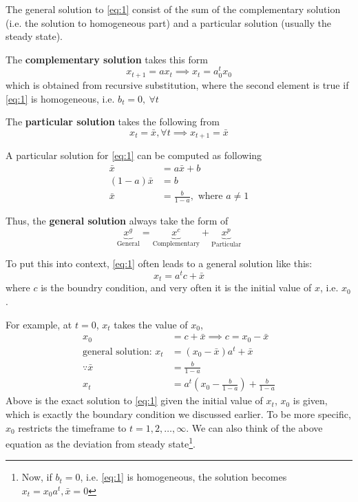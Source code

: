 \documentclass[twocolumn, fleqn]{article}
\begin{document}
		The general solution to \eqref{eq:1} consist of the sum of the complementary solution (i.e. the solution to
		homogeneous part) and a particular solution (usually the steady state).

		The \textbf{complementary solution} takes this form
		\begin{equation*}
			x_{t+1} = a x_t \implies x_t = a_0^t x_0
		\end{equation*}
		which is obtained from recursive substitution, where the second element is true if \eqref{eq:1} is homogeneous,
		i.e. $b_t =0, \ \forall t$

		The \textbf{particular solution} takes the following from
		\begin{equation*}
			x_t = \bar{x}, \forall t \implies x_{t+1}=\bar{x}
		\end{equation*}

		A particular solution for \eqref{eq:1} can be computed as following
		\begin{align*}
			\bar{x} &= a \bar{x} +b \\
			(1-a)\bar{x} &= b\\
			\bar{x} &= \frac{b}{1-a}, \text{ where } a \neq 1
		\end{align*}

		Thus, the \textbf{general solution} always take the form of
		\begin{equation}
			\underbrace{x^g}_{\text{General}} = \underbrace{x^c}_{\text{Complementary}} + \underbrace{x^p}_{
				\text{Particular}}\label{eq:1.2}
		\end{equation}

		To put this into context, \eqref{eq:1} often leads to a general solution like this:
		\begin{equation*}
			x_t = a^t c +\bar{x}
		\end{equation*}
		where $c$ is the boundry condition, and very often it is the initial value of $x$, i.e. $x_0$.

		For example, at $t =0$, $x_t$ takes the value of $x_0$,
		\begin{align*}
			x_0 &= c + \bar{x} \implies c = x_0 - \bar{x}\\
			\text{general solution: } x_t &= (x_0 - \bar{x})a^t + \bar{x}\\
			\because \bar{x} &= \frac{b}{1-a}\\
			x_t &= a^t(x_0 - \frac{b}{1-a}) + \frac{b}{1-a}
		\end{align*}
		Above is the exact solution to \eqref{eq:1} given the initial value of $x_t$, $x_0$ is given, which is exactly
		the boundary condition we discussed earlier.
		To be more specific, $x_0$ restricts the timeframe to
		$t = 1, 2, \dots, \infty$.
		We can also think of the above equation as the deviation from steady state\footnote{Now, if $b_t =0$, i.e. \eqref{eq:1} is homogeneous, the solution becomes $x_{t} = x_0 a^t, \bar{x}=0$}.
\end{document}
